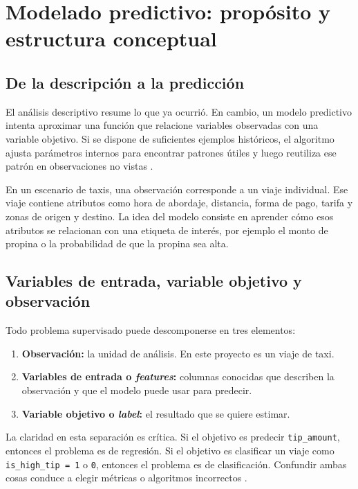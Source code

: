 \documentclass[12pt]{article}
\begin{document}
\section{Modelado predictivo: propósito y estructura conceptual}
\subsection{De la descripción a la predicción}
El análisis descriptivo resume lo que ya ocurrió. En cambio, un modelo predictivo intenta aproximar una función que relacione variables observadas con una variable objetivo. Si se dispone de suficientes ejemplos históricos, el algoritmo ajusta parámetros internos para encontrar patrones útiles y luego reutiliza ese patrón en observaciones no vistas \cite{gcp_bqml_eval_overview}.

En un escenario de taxis, una observación corresponde a un viaje individual. Ese viaje contiene atributos como hora de abordaje, distancia, forma de pago, tarifa y zonas de origen y destino. La idea del modelo consiste en aprender cómo esos atributos se relacionan con una etiqueta de interés, por ejemplo el monto de propina o la probabilidad de que la propina sea alta.

\subsection{Variables de entrada, variable objetivo y observación}
Todo problema supervisado puede descomponerse en tres elementos:
\begin{enumerate}[label=\textbf{M\arabic*.}, leftmargin=*]
\item \textbf{Observación:} la unidad de análisis. En este proyecto es un viaje de taxi.
\item \textbf{Variables de entrada o \textit{features}:} columnas conocidas que describen la observación y que el modelo puede usar para predecir.
\item \textbf{Variable objetivo o \textit{label}:} el resultado que se quiere estimar.
\end{enumerate}

La claridad en esta separación es crítica. Si el objetivo es predecir \texttt{tip\_amount}, entonces el problema es de regresión. Si el objetivo es clasificar un viaje como \texttt{is\_high\_tip = 1} o \texttt{0}, entonces el problema es de clasificación. Confundir ambas cosas conduce a elegir métricas o algoritmos incorrectos \cite{google_metrics_glossary}.
\end{document}
